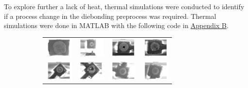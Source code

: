 To explore further a lack of heat, thermal simulations were conducted to identify if a process change in the diebonding preprocess was required. Thermal simulations were done in MATLAB with the following code in
\hyperref[sec:ThermalSimulationCode]{Appendix B}.

\begin{figure}[h]
    \centering
\begin{subfigure}[t]{0.4\textwidth}
    \centering
    \begin{tabular}{c c c c}
    \includegraphics[height=1cm]{Main/Ch2/extracted/SEM/In-EP-EDx_TBP-01-A1-s1_media_image.png} &
    \includegraphics[height=1cm]{Main/Ch2/extracted/SEM/In-EP-EDx_TBP-01-A1-s2_media_image.png} &
    \includegraphics[height=1cm]{Main/Ch2/extracted/SEM/In-EP-EDx_TBP-01-A2-s1_media_image.png} &
    \includegraphics[height=1cm]{Main/Ch2/extracted/SEM/In-EP-EDx_TBP-01-A2-s2_media_image.png} \\
    \includegraphics[height=1cm]{Main/Ch2/extracted/SEM/In-EP-EDx_TBP-01-B2-s1_media_image.png} &
    \includegraphics[height=1cm]{Main/Ch2/extracted/SEM/In-EP-EDx_TBP-01-B2-s2_media_image.png} &
    \includegraphics[height=1cm]{Main/Ch2/extracted/SEM/In-EP-EDx_TBP-02-A1-s1_media_image.png} &
    \includegraphics[height=1cm]{Main/Ch2/extracted/SEM/In-EP-EDx_TBP-02-A1-s2_media_image.png} \\

\end{tabular}
\end{subfigure}
\end{figure}
